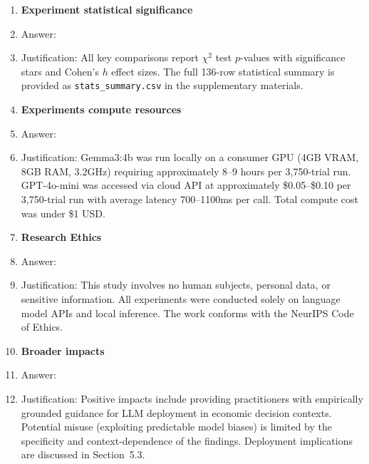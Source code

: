 \documentclass{article}
\begin{document}
\begin{enumerate}
\item \textbf{Experiment statistical significance}
\item[] Answer: \answerYes{}
\item[] Justification: All key comparisons report $\chi^2$ test $p$-values with significance stars
and Cohen's $h$ effect sizes. The full 136-row statistical summary is provided as
\texttt{stats\_summary.csv} in the supplementary materials.

\item \textbf{Experiments compute resources}
\item[] Answer: \answerYes{}
\item[] Justification: Gemma3:4b was run locally on a consumer GPU (4GB VRAM, 8GB RAM, 3.2GHz)
requiring approximately 8--9 hours per 3,750-trial run. GPT-4o-mini was accessed via cloud API
at approximately \$0.05--\$0.10 per 3,750-trial run with average latency 700--1100ms per call.
Total compute cost was under \$1 USD.

\item \textbf{Research Ethics}
\item[] Answer: \answerYes{}
\item[] Justification: This study involves no human subjects, personal data, or sensitive information.
All experiments were conducted solely on language model APIs and local inference. The work conforms
with the NeurIPS Code of Ethics.

\item \textbf{Broader impacts}
\item[] Answer: \answerYes{}
\item[] Justification: Positive impacts include providing practitioners with empirically grounded
guidance for LLM deployment in economic decision contexts. Potential misuse (exploiting predictable
model biases) is limited by the specificity and context-dependence of the findings. Deployment
implications are discussed in Section~5.3.

\end{enumerate}
\end{document}
